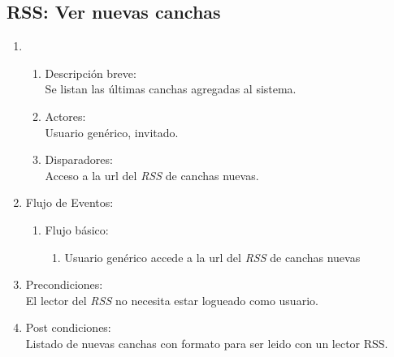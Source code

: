 \documentclass[a4paper,11pt]{article}
\begin{document}
\subsection{RSS: Ver nuevas canchas}
\begin{enumerate}

    \item
    \begin{enumerate}
        \item Descripci\'on breve: \\
            Se listan las \'ultimas canchas agregadas al sistema.
        \item Actores: \\
            Usuario gen\'erico, invitado.
        \item Disparadores: \\
            Acceso a la url del \emph{RSS} de canchas nuevas.
    \end{enumerate}

    \item Flujo de Eventos: 

        \begin{enumerate}
            \item Flujo b\'asico:
        	\begin{enumerate}        
		\item 	Usuario gen\'erico accede a la url del \emph{RSS} de canchas nuevas
	        \end{enumerate}
	\end{enumerate}

    \item Precondiciones: \\
        El lector del \emph{RSS} no necesita estar logueado como usuario.
    \item Post condiciones: \\
        Listado de nuevas canchas con formato para ser leido con un lector RSS.

\end{enumerate}

\end{document}
